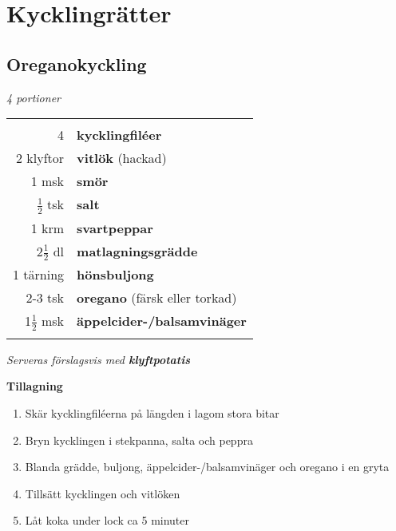 \documentclass[a4paper,12pt]{article}
\newcommand{\port}[1]{\noindent \textit{#1 portioner}}
\newcommand{\tillb}[1]{\noindent \textit{Serveras förslagsvis med \textbf{#1}} \vspace{1cm}}
\begin{document}

\section{Kycklingrätter}

\clearpage

\subsection{Oreganokyckling}
\port{4}

\begin{table}[H]
	\begin{tabular}{rl}
	\hline
	&\\
		4 & \textbf{kycklingfiléer}\\
		2 klyftor & \textbf{vitlök} (hackad)\\
		1 msk & \textbf{smör}\\
		$\frac{1}{2}$ tsk & \textbf{salt}\\
		1 krm & \textbf{svartpeppar}\\
		2$\frac{1}{2}$ dl & \textbf{matlagningsgrädde}\\
		1 tärning & \textbf{hönsbuljong}\\
		2-3 tsk & \textbf{oregano} (färsk eller torkad)\\
		1$\frac{1}{2}$ msk & \textbf{äppelcider-/balsamvinäger}\\
	&\\
	\hline
	\end{tabular}
\end{table}

\tillb{klyftpotatis}

\begin{multicols*}{2}

\noindent \textbf{Tillagning}
\begin{enumerate}
	\itemsep0cm
	\item Skär kycklingfiléerna på \mbox{längden} i lagom stora bitar
	\item Bryn kycklingen i stekpanna, salta och peppra
	\item Blanda grädde, buljong, äppelcider-/balsamvinäger och oregano i en gryta
	\item Tillsätt kycklingen och vitlöken
	\item Låt koka under lock ca 5 \mbox{minuter}
\end{enumerate}

\end{multicols*}
\end{document}
